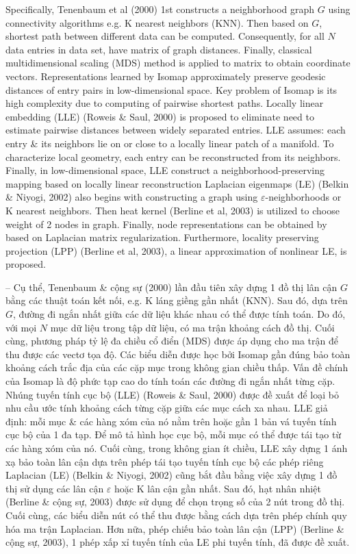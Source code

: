 \documentclass{article}
\begin{document}
\begin{itemize}
\begin{itemize}
        Specifically, Tenenbaum et al (2000) 1st constructs a neighborhood graph $G$ using connectivity algorithms e.g. K nearest neighbors (KNN). Then based on $G$, shortest path between different data can be computed. Consequently, for all $N$ data entries in data set, have matrix of graph distances. Finally, classical multidimensional scaling (MDS) method is applied to matrix to obtain coordinate vectors. Representations learned by Isomap approximately preserve geodesic distances of entry pairs in low-dimensional space. Key problem of Isomap is its high complexity due to computing of pairwise shortest paths. Locally linear embedding (LLE) (Roweis \& Saul, 2000) is proposed to eliminate need to estimate pairwise distances between widely separated entries. LLE assumes: each entry \& its neighbors lie on or close to a locally linear patch of a manifold. To characterize local geometry, each entry can be reconstructed from its neighbors. Finally, in low-dimensional space, LLE construct a neighborhood-preserving mapping based on locally linear reconstruction Laplacian eigenmaps (LE) (Belkin \& Niyogi, 2002) also begins with constructing a graph using $\varepsilon$-neighborhoods or K nearest neighbors. Then heat kernel (Berline et al, 2003) is utilized to choose weight of 2 nodes in graph. Finally, node representations can be obtained by based on Laplacian matrix regularization. Furthermore, locality preserving projection (LPP) (Berline et al, 2003), a linear approximation of nonlinear LE, is proposed.

        -- Cụ thể, Tenenbaum \& cộng sự (2000) lần đầu tiên xây dựng 1 đồ thị lân cận $G$ bằng các thuật toán kết nối, e.g. K láng giềng gần nhất (KNN). Sau đó, dựa trên $G$, đường đi ngắn nhất giữa các dữ liệu khác nhau có thể được tính toán. Do đó, với mọi $N$ mục dữ liệu trong tập dữ liệu, có ma trận khoảng cách đồ thị. Cuối cùng, phương pháp tỷ lệ đa chiều cổ điển (MDS) được áp dụng cho ma trận để thu được các vectơ tọa độ. Các biểu diễn được học bởi Isomap gần đúng bảo toàn khoảng cách trắc địa của các cặp mục trong không gian chiều thấp. Vấn đề chính của Isomap là độ phức tạp cao do tính toán các đường đi ngắn nhất từng cặp. Nhúng tuyến tính cục bộ (LLE) (Roweis \& Saul, 2000) được đề xuất để loại bỏ nhu cầu ước tính khoảng cách từng cặp giữa các mục cách xa nhau. LLE giả định: mỗi mục \& các hàng xóm của nó nằm trên hoặc gần 1 bản vá tuyến tính cục bộ của 1 đa tạp. Để mô tả hình học cục bộ, mỗi mục có thể được tái tạo từ các hàng xóm của nó. Cuối cùng, trong không gian ít chiều, LLE xây dựng 1 ánh xạ bảo toàn lân cận dựa trên phép tái tạo tuyến tính cục bộ các phép riêng Laplacian (LE) (Belkin \& Niyogi, 2002) cũng bắt đầu bằng việc xây dựng 1 đồ thị sử dụng các lân cận $\varepsilon$ hoặc K lân cận gần nhất. Sau đó, hạt nhân nhiệt (Berline \& cộng sự, 2003) được sử dụng để chọn trọng số của 2 nút trong đồ thị. Cuối cùng, các biểu diễn nút có thể thu được bằng cách dựa trên phép chính quy hóa ma trận Laplacian. Hơn nữa, phép chiếu bảo toàn lân cận (LPP) (Berline \& cộng sự, 2003), 1 phép xấp xỉ tuyến tính của LE phi tuyến tính, đã được đề xuất.


\end{itemize}
\end{itemize}
\end{document}

